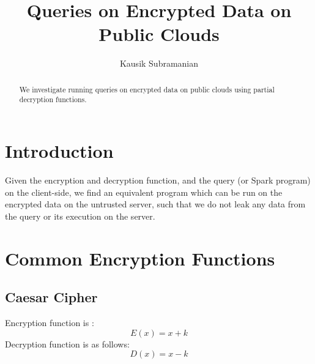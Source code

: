 \documentclass[]{article}
\title{Queries on Encrypted Data on Public Clouds}
\author{Kausik Subramanian}
\begin{document}
\maketitle

\begin{abstract}
We investigate running queries on encrypted data on public clouds using partial decryption functions. 
\end{abstract}

\section{Introduction}
Given the encryption and decryption function, and the query (or Spark program) 
on the client-side, we find an equivalent program which can be run on the encrypted
data on the untrusted server, such that we do not leak any data from the 
query or its execution on the server. 
\section{Common Encryption Functions}
\subsection{Caesar Cipher}
Encryption function is :
 \begin{equation}
 E(x) = x + k
 \end{equation}
Decryption function is as follows:
\begin{equation}
	D(x) = x - k
\end{equation}
\end{document}
